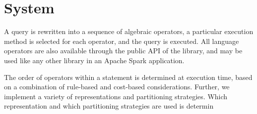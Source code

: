 \section{System}
\label{sec:sys}

A \ql query is rewritten into a sequence of algebraic operators, a
particular execution method is selected for each operator, and the
query is executed.  All language operators are also available through
the public API of the \ql library, and may be used like any other
library in an Apache Spark application.

The order of operators within a \ql statement is determined at
execution time, based on a combination of rule-based and cost-based
considerations.  Further, we implement a variety of \tg
representations and partitioning strategies.  Which representation and
which partitioning strategies are used is determin

